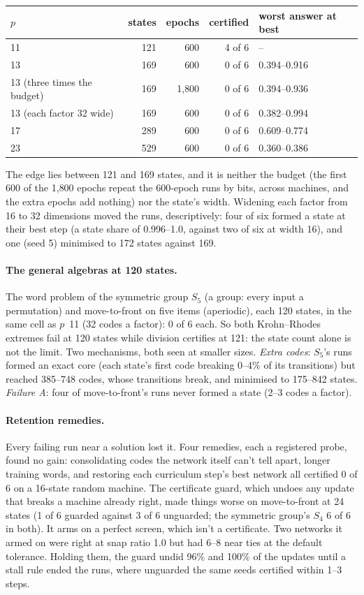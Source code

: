 \documentclass[11pt]{article}
\begin{document}
\begin{center}
\begin{tabular}{lrrrl}
\toprule
$p$ & states & epochs & certified & worst answer at best \\
\midrule
11 & 121 & 600 & 4 of 6 & -- \\
13 & 169 & 600 & 0 of 6 & 0.394--0.916 \\
13 (three times the budget) & 169 & 1{,}800 & 0 of 6 & 0.394--0.936 \\
13 (each factor 32 wide) & 169 & 600 & 0 of 6 & 0.382--0.994 \\
17 & 289 & 600 & 0 of 6 & 0.609--0.774 \\
23 & 529 & 600 & 0 of 6 & 0.360--0.386 \\
\bottomrule
\end{tabular}
\end{center}

The edge lies between 121 and 169 states, and it is neither the budget (the first 600 of the
1{,}800 epochs repeat the 600-epoch runs by bits, across machines, and the extra epochs add
nothing) nor the state's width. Widening each factor from 16 to 32 dimensions moved the runs,
descriptively: four of six formed a state at their best step (a state share of 0.996--1.0, against
two of six at width 16), and one (seed 5) minimised to 172 states against 169.

\paragraph{The general algebras at 120 states.} The word problem of the symmetric group $S_5$ (a
group: every input a permutation) and move-to-front on five items (aperiodic), each 120 states, in
the same cell as $p$~11 (32 codes a factor): 0 of 6 each. So both Krohn--Rhodes extremes fail at
120 states while division certifies at 121: the state count alone is not the limit. Two mechanisms,
both seen at smaller sizes. \emph{Extra codes}: $S_5$'s runs formed an exact core (each state's
first code breaking 0--4\% of its transitions) but reached 385--748 codes, whose transitions break,
and minimised to 175--842 states. \emph{Failure A}: four of move-to-front's runs never formed a
state (2--3 codes a factor).

\paragraph{Retention remedies.} Every failing run near a solution lost it. Four remedies, each a
registered probe, found no gain: consolidating codes the network itself can't tell apart, longer
training words, and restoring each curriculum step's best network all certified 0 of 6 on a
16-state random machine. The certificate guard, which undoes any update that breaks a machine
already right, made things worse on move-to-front at 24 states (1 of 6 guarded against 3 of 6
unguarded; the symmetric group's $S_4$ 6 of 6 in both). It arms on a perfect screen, which isn't a
certificate. Two networks it armed on were right at snap ratio 1.0 but had 6--8 near ties at the
default tolerance. Holding them, the guard undid 96\% and 100\% of the updates until a stall rule
ended the runs, where unguarded the same seeds certified within 1--3 steps.
\end{document}
